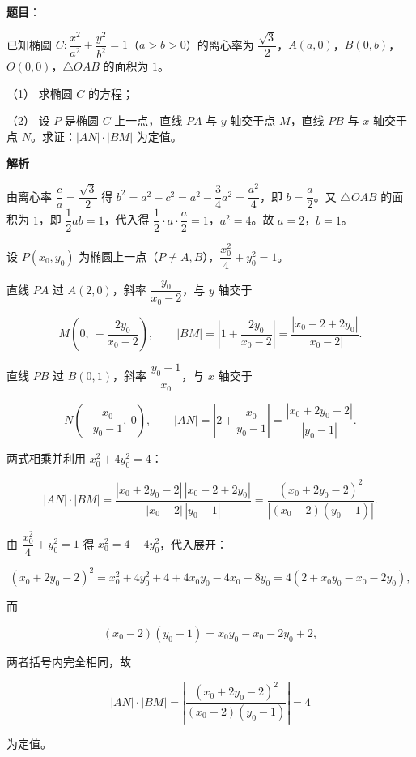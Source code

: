 \begin{answer}

\textbf{题目}：

已知椭圆 \(C:\dfrac{x^{2}}{a^{2}}+\dfrac{y^{2}}{b^{2}}=1\)（\(a>b>0\)）的离心率为 \(\dfrac{\sqrt{3}}{2}\)，\(A(a,0)\)，\(B(0,b)\)，\(O(0,0)\)，\(\triangle OAB\) 的面积为 \(1\)。

（1） 求椭圆 \(C\) 的方程；

（2） 设 \(P\) 是椭圆 \(C\) 上一点，直线 \(PA\) 与 \(y\) 轴交于点 \(M\)，直线 \(PB\) 与 \(x\) 轴交于点 \(N\)。求证：\(|AN|\cdot|BM|\) 为定值。

\textbf{解析}


由离心率 \(\dfrac ca=\dfrac{\sqrt3}{2}\) 得 \(b^2=a^2-c^2=a^2-\dfrac34a^2=\dfrac{a^2}{4}\)，即 \(b=\dfrac a2\)。又 \(\triangle OAB\) 的面积为 \(1\)，即 \(\dfrac12ab=1\)，代入得 \(\dfrac12\cdot a\cdot\dfrac a2=1\)，\(a^2=4\)。故 \(a=2\)，\(b=1\)。


设 \(P(x_0,y_0)\) 为椭圆上一点（\(P\neq A,B\)），\(\dfrac{x_0^2}{4}+y_0^2=1\)。

直线 \(PA\) 过 \(A(2,0)\)，斜率 \(\dfrac{y_0}{x_0-2}\)，与 \(y\) 轴交于

\nopagebreak[4]
\[
M\left(0,\ -\frac{2y_0}{x_0-2}\right),\qquad
|BM|=\left|1+\frac{2y_0}{x_0-2}\right|=\frac{|x_0-2+2y_0|}{|x_0-2|}.
\]

直线 \(PB\) 过 \(B(0,1)\)，斜率 \(\dfrac{y_0-1}{x_0}\)，与 \(x\) 轴交于

\nopagebreak[4]
\[
N\left(-\frac{x_0}{y_0-1},\ 0\right),\qquad
|AN|=\left|2+\frac{x_0}{y_0-1}\right|=\frac{|x_0+2y_0-2|}{|y_0-1|}.
\]

两式相乘并利用 \(x_0^2+4y_0^2=4\)：

\nopagebreak[4]
\[
|AN|\cdot|BM|=\frac{|x_0+2y_0-2|\,|x_0-2+2y_0|}{|x_0-2|\,|y_0-1|}
=\frac{(x_0+2y_0-2)^2}{|(x_0-2)(y_0-1)|}.
\]

由 \(\dfrac{x_0^2}{4}+y_0^2=1\) 得 \(x_0^2=4-4y_0^2\)，代入展开：

\nopagebreak[4]
\[
(x_0+2y_0-2)^2=x_0^2+4y_0^2+4+4x_0y_0-4x_0-8y_0=4(2+x_0y_0-x_0-2y_0),
\]

而

\nopagebreak[4]
\[
(x_0-2)(y_0-1)=x_0y_0-x_0-2y_0+2,
\]

两者括号内完全相同，故

\nopagebreak[4]
\[
|AN|\cdot|BM|=\left|\frac{(x_0+2y_0-2)^2}{(x_0-2)(y_0-1)}\right|=4
\]

为定值。



\end{answer}
